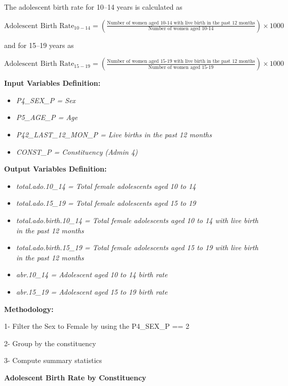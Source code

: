 \documentclass[
]{article}
\begin{document}
The adolescent birth rate for 10--14 years is calculated as

\(\text{Adolescent Birth Rate}_{10-14} = \left( \frac{\text{Number of women aged 10-14 with live birth in the past 12 months}}{\text{Number of women aged 10-14}} \right) \times 1000\)

and for 15--19 years as

\(\text{Adolescent Birth Rate}_{15-19} = \left( \frac{\text{Number of women aged 15-19 with live birth in the past 12 months}}{\text{Number of women aged 15-19}} \right) \times 1000\)

\textbf{Input Variables Definition:}

\begin{itemize}
\item
  \emph{P4\_SEX\_P = Sex}
\item
  \emph{P5\_AGE\_P = Age}
\item
  \emph{P42\_LAST\_12\_MON\_P = Live births in the past 12 months}
\item
  \emph{CONST\_P = Constituency (Admin 4)}
\end{itemize}

\textbf{Output Variables Definition:}

\begin{itemize}
\item
  \emph{total.ado.10\_14 = Total female adolescents aged 10 to 14}
\item
  \emph{total.ado.15\_19 = Total female adolescents aged 15 to 19}
\item
  \emph{total.ado.birth.10\_14 = Total female adolescents aged 10 to 14
  with live birth in the past 12 months}
\item
  \emph{total.ado.birth.15\_19 = Total female adolescents aged 15 to 19
  with live birth in the past 12 months}
\item
  \emph{abr.10\_14 = Adolescent aged 10 to 14 birth rate}
\item
  \emph{abr.15\_19 = Adolescent aged 15 to 19 birth rate}
\end{itemize}

\textbf{Methodology:}

1- Filter the Sex to Female by using the P4\_SEX\_P == 2

2- Group by the constituency

3- Compute summary statistics

\textbf{Adolescent Birth Rate by Constituency}
\end{document}
